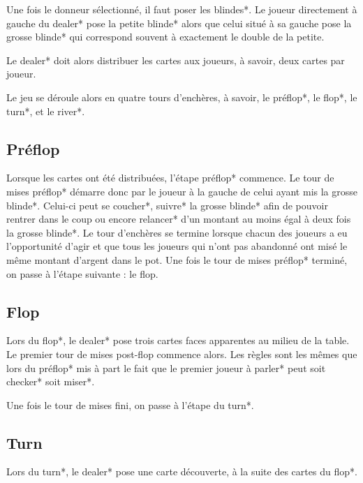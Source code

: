 \documentclass{report}
\begin{document}
Une fois le donneur sélectionné, il faut poser les blindes*. Le joueur directement à gauche du dealer* pose la petite blinde* alors que celui situé à sa gauche pose la grosse blinde* qui correspond souvent à exactement le double de la petite.\par

Le dealer* doit alors distribuer les cartes aux joueurs, à savoir, deux cartes par joueur. \par

Le jeu se déroule alors en quatre tours d'enchères, à savoir, le préflop*, le flop*, le turn*, et le river*.\par

\subsection{Préflop}
\hspace{0.5cm}Lorsque les cartes ont été distribuées, l'étape préflop* commence. Le tour de mises préflop* démarre donc par le joueur à la gauche de celui ayant mis la grosse blinde*. Celui-ci peut se coucher*, suivre* la grosse blinde* afin de pouvoir rentrer dans le coup ou encore relancer* d'un montant au moins égal à deux fois la grosse blinde*. Le tour d'enchères se termine lorsque chacun des joueurs a eu l'opportunité d'agir et que tous les joueurs qui n'ont pas abandonné ont misé le même montant d'argent dans le pot. Une fois le tour de mises préflop* terminé, on passe à l'étape suivante : le flop.\par

\subsection{Flop}
\hspace{0.5cm}Lors du flop*, le dealer* pose trois cartes faces apparentes au milieu de la table. Le premier tour de mises post-flop commence alors. Les règles sont les mêmes que lors du préflop* mis à part le fait que le premier joueur à parler* peut soit checker* soit miser*.\par

Une fois le tour de mises fini, on passe à l'étape du turn*.\par
\subsection{Turn}
Lors du turn*, le dealer* pose une carte découverte, à la suite des cartes du flop*. \par
\end{document}
